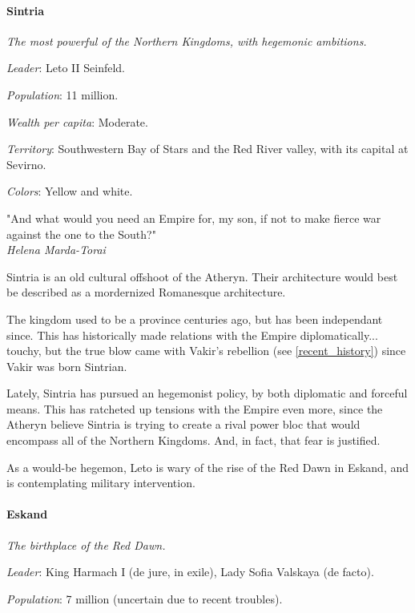 \paragraph{Sintria}

\textit{The most powerful of the Northern Kingdoms, with hegemonic ambitions.}

\textit{Leader}: Leto II Seinfeld.

\textit{Population}: 11 million.

\textit{Wealth per capita}: Moderate.

\textit{Territory}: Southwestern Bay of Stars and the Red River valley, with its capital at Sevirno.
    
\textit{Colors}: Yellow and white.


\begin{rpg-quotebox}
    "And what would you need an Empire for, my son, if not to make fierce war against the one to the South?" \\ \textendash \textit{Helena Marda-Torai}
\end{rpg-quotebox}


Sintria is an old cultural offshoot of the Atheryn. Their architecture would best be described as a mordernized Romanesque architecture.

The kingdom used to be a province centuries ago, but has been independant since. This has historically made relations with the Empire diplomatically... touchy, but the true blow came with Vakir's rebellion (see \ref{recent_history}) since Vakir was born Sintrian.

Lately, Sintria has pursued an hegemonist policy, by both diplomatic and forceful means. This has ratcheted up tensions with the Empire even more, since the Atheryn believe Sintria is trying to create a rival power bloc that would encompass all of the Northern Kingdoms. And, in fact, that fear is justified.

As a would-be hegemon, Leto is wary of the rise of the Red Dawn in Eskand, and is contemplating military intervention.


\paragraph{Eskand}

\textit{The birthplace of the Red Dawn.}

\textit{Leader}: King Harmach I (de jure, in exile), Lady Sofia Valskaya (de facto).

\textit{Population}: 7 million (uncertain due to recent troubles).

